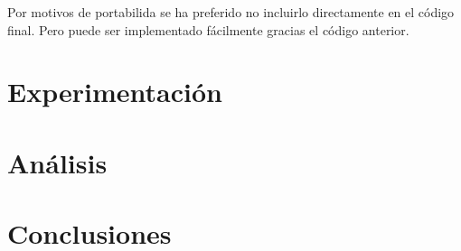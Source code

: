 \documentclass[12pt,a4paper]{article}
\begin{document}
Por motivos de portabilida se ha preferido no incluirlo directamente en el código final. Pero puede ser implementado fácilmente gracias el código anterior.


\clearpage
\section{Experimentación}

\clearpage
\section{Análisis}

\clearpage
\section{Conclusiones}

\clearpage


\end{document}
